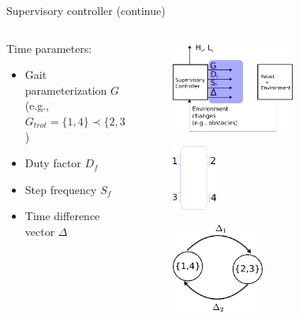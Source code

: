 \documentclass{beamer}
\begin{document}
\begin{frame}{Supervisory controller (continue)}
		\begin{columns}
		\hspace{1cm}
		\begin{column}{0.5\textwidth}
		Time parameters:
		\begin{itemize}
			\setlength\itemsep{3em}
			\item Gait parameterization $G$ (e.g., $G_{trot}=\{1,4\}\prec\{2,3\}$)
			\item Duty factor $D_f$
			\item Step frequency $S_f$
			\item Time difference vector $\Delta$
		\end{itemize}	
		
		\end{column}
		\begin{column}{0.5\textwidth}
			\begin{figure}[ht]\centering
				\includegraphics[width=0.6\textwidth]{images/Supervisoryb.pdf}
			\end{figure}
			\vspace{-0.25cm}\begin{figure}[ht]\centering
							\includegraphics[width=0.22\textwidth]{images/Numbers.pdf}
			\end{figure}
			\begin{figure}[ht]\centering
				\includegraphics[width=0.45\textwidth]{images/TrotTime.pdf}
			\end{figure}
		\end{column}
		\end{columns}
\end{frame}
\end{document}

